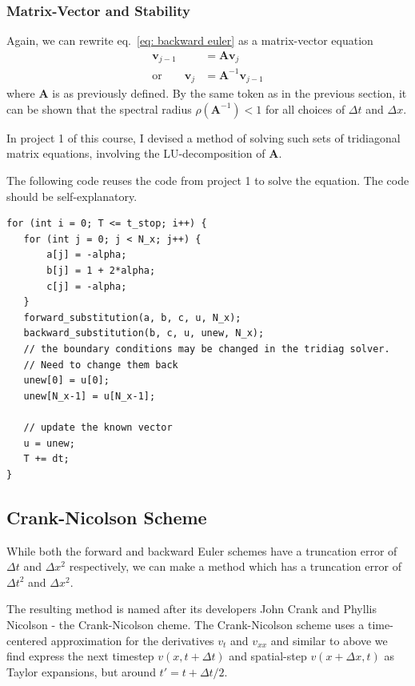 \documentclass[twoside, 11pt]{article}
\begin{document}
		\subsubsection{Matrix-Vector and Stability}
			Again, we can rewrite eq.~\eqref{eq: backward euler} as a matrix-vector equation
			\begin{align*}
				\mathbf{v}_{j-1} &= \mathbf{A}\mathbf{v}_j \\
				\mathrm{or} \qquad \mathbf{v}_j &= \mathbf{A}^{-1}\mathbf{v}_{j-1}
			\end{align*}
			where $\mathbf{A}$ is as previously defined. By the same token as in the previous section, it can be shown that the spectral radius $\rho(\mathbf{A}^{-1}) < 1$ for all choices of $\Delta t$ and $\Delta x$. 
			
			In project 1 of this course, I devised a method of solving such sets of tridiagonal matrix equations\cite{project1}, involving the LU-decomposition of $\mathbf{A}$. 
			
			The following code reuses the code from project 1 to solve the equation. The code should be self-explanatory.
			\begin{lstlisting}
for (int i = 0; T <= t_stop; i++) {
   for (int j = 0; j < N_x; j++) {
       a[j] = -alpha;
       b[j] = 1 + 2*alpha;
       c[j] = -alpha;
   }
   forward_substitution(a, b, c, u, N_x);
   backward_substitution(b, c, u, unew, N_x);
   // the boundary conditions may be changed in the tridiag solver. 
   // Need to change them back
   unew[0] = u[0];
   unew[N_x-1] = u[N_x-1];

   // update the known vector
   u = unew;
   T += dt;
}
			\end{lstlisting}
			
			
			\subsection{Crank-Nicolson Scheme}
				While both the forward and backward Euler schemes have a truncation error of $\Delta t$ and $\Delta x^2$ respectively, we can make a method which has a truncation error of $\Delta t^2$ and $\Delta x^2$.
				
				The resulting method is named after its developers John Crank and Phyllis Nicolson - the Crank-Nicolson cheme. The Crank-Nicolson scheme uses a time-centered approximation for the derivatives $v_{t}$ and $v_{xx}$ and similar to above we find express the next timestep $v(x, t+\Delta t)$ and spatial-step $v(x+\Delta x, t)$ as Taylor expansions, but around $t'=t+\Delta t/2$.
				
\end{document}

